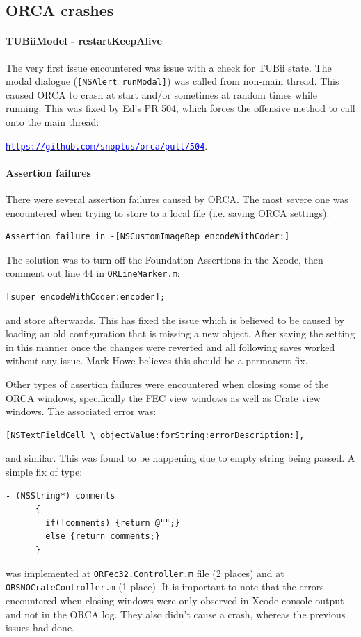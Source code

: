 \documentclass[a4paper,10pt]{article}
\newcommand{\link}[1]{\href{#1}{\textcolor{blue}{\texttt{#1}}}} %
\begin{document}
\clearpage
\subsection{ORCA crashes\label{app:ORCA}}
\paragraph{TUBiiModel - restartKeepAlive}
The very first issue encountered was issue with a check for TUBii state. The modal dialogue ({\tt [NSAlert runModal]}) was called from non-main thread. This caused ORCA to crash at start and/or sometimes at random times while running. This was fixed by Ed's PR 504, which forces the offensive method to call onto the main thread:

\qquad\link{https://github.com/snoplus/orca/pull/504}. 

\paragraph{Assertion failures}
There were several assertion failures caused by ORCA. The most severe one was encountered when trying to store to a local file (i.e. saving ORCA settings):
\begin{Verbatim}[xleftmargin=-8mm]
	Assertion failure in -[NSCustomImageRep encodeWithCoder:]
\end{Verbatim}

The solution was to turn off the Foundation Assertions in the Xcode, then comment out line 44 in {\tt ORLineMarker.m}:
\begin{Verbatim}[xleftmargin=-8mm]
	[super encodeWithCoder:encoder];
\end{Verbatim}
and store afterwards. This has fixed the issue which is believed to be caused by loading an old configuration that is missing a new object. After saving the setting in this manner once the changes were reverted and all following saves worked without any issue. Mark Howe believes this should be a permanent fix. 

Other types of assertion failures were encountered when closing some of the ORCA windows, specifically the FEC view windows as well as Crate view windows. The associated error was:
\begin{Verbatim}[xleftmargin=-8mm]
	[NSTextFieldCell \_objectValue:forString:errorDescription:],
\end{Verbatim}
and similar. This was found to be happening due to empty string being passed. A simple fix of type:
\begin{Verbatim}[xleftmargin=-8mm]
	- (NSString*) comments
	  {
	    if(!comments) {return @"";}
	    else {return comments;}
	  }
\end{Verbatim}
was implemented at {\tt ORFec32.Controller.m} file (2 places) and at {\tt ORSNOCrateController.m} (1 place). It is important to note that the errors encountered when closing windows were only observed in Xcode console output and not in the ORCA log. They also didn't cause a crash, whereas the previous issues had done.
\end{document}
